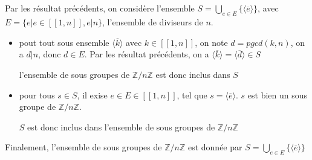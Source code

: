 \documentclass[a4paper,12pt]{book}
\begin{document}
\subsection{}
Par les résultat précédents, on considère l'ensemble $S=\bigcup_{e \in E}\{\langle \overline{e}\rangle\}$, avec $E=\{e|e \in [\![1,n]\!],e|n\}$, l'ensemble de diviseurs de $n$.
\begin{itemize}
    \item pout tout sous ensemble $\langle \overline{k}\rangle$ avec $k \in [\![1,n]\!]$, on note $d=pgcd(k,n)$, on a $d|n$, donc $d \in E$. Par les résultat précédents, on a $\langle \overline{k}\rangle=\langle \overline{d}\rangle \in S$
    
    l'ensemble de sous groupes de $\mathbb{Z}/n\mathbb{Z}$ est donc inclus dans $S$
    \item pour tous $s \in S$, il exise $e \in E \in [\![1,n]\!]$, tel que $s=\langle \overline{e}\rangle$. $s$ est bien un sous groupe de $\mathbb{Z}/n\mathbb{Z}$. 
    
    $S$ est donc inclus dans l'ensemble de sous groupes de $\mathbb{Z}/n\mathbb{Z}$

\end{itemize}
Finalement, l'ensemble de sous groupes de $\mathbb{Z}/n\mathbb{Z}$ est donnée par $\boxed{S=\bigcup_{e \in E}\{\langle \overline{e}\rangle\}}$
\end{document}
